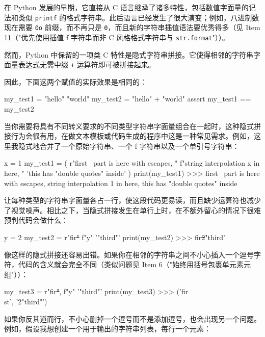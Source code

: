 在 Python 发展的早期，它直接从 C 语言继承了诸多特性，包括数值字面量的记法和类似 \texttt{printf} 的格式字符串。此后语言已经发生了很大演变；例如，八进制数现在需要 \texttt{0o} 前缀，而不再只是 \texttt{0}，而且新的字符串插值语法要优秀得多（见 Item 11（"优先使用插值 f 字符串而非 C 风格格式字符串与 \texttt{str.format}"））。

然而，Python 中保留的一项类 C 特性是隐式字符串拼接。它使得相邻的字符串字面量表达式无需中缀 \texttt{+} 运算符即可被拼接起来。

因此，下面这两个赋值的实际效果是相同的：

\begin{codebox}[python]
my_test1 = "hello" "world"
my_test2 = "hello" + "world"
assert my_test1 == my_test2
\end{codebox}

当你需要将具有不同转义要求的不同类型字符串字面量组合在一起时，这种隐式拼接行为会很有用，在做文本模板或代码生成的程序中这是一种常见需求。例如，这里我隐式地合并了一个原始字符串、一个 f 字符串以及一个单引号字符串：

\begin{codebox}[python]
x = 1
my_test1 = (
    r"first \ part is here with escapes\n, "
    f"string interpolation {x} in here, "
    'this has "double quotes" inside'
)
print(my_test1)
>>>
first \ part is here with escapes\n, string interpolation 1 in
here, this has "double quotes" inside
\end{codebox}

让每种类型的字符串字面量各占一行，使这段代码更易读，而且缺少运算符也减少了视觉噪声。相比之下，当隐式拼接发生在单行上时，在不额外留心的情况下很难预判代码会做什么：

\begin{codebox}[python]
y = 2
my_test2 = r"fir\st" f"{y}" '"third"'
print(my_test2)
>>>
fir\st2"third"
\end{codebox}

像这样的隐式拼接还容易出错。如果你在相邻的字符串之间不小心插入一个逗号字符，代码的含义就会完全不同（类似问题见 Item 6（"始终用括号包裹单元素元组"））：

\begin{codebox}[python]
my_test3 = r"fir\st", f"{y}" '"third"'
print(my_test3)
>>>
('fir\\st', '2"third"')
\end{codebox}

如果你反其道而行，不小心删掉一个逗号而不是添加逗号，也会出现另一个问题。例如，假设我想创建一个用于输出的字符串列表，每行一个元素：

